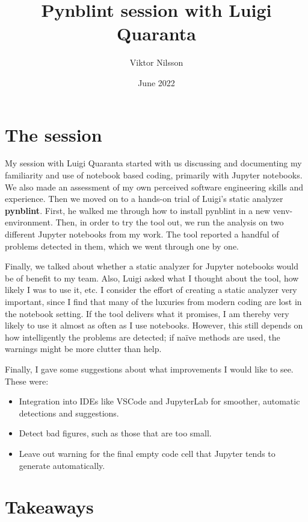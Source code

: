 \documentclass[11pt]{article}
\title{Pynblint session with Luigi Quaranta}
\author{Viktor Nilsson}
\date{June 2022}
\begin{document}
\maketitle

\section{The session}

My session with Luigi Quaranta started with us discussing and documenting my familiarity and use of notebook based coding, primarily with Jupyter notebooks. 
We also made an assessment of my own perceived software engineering skills and experience. 
Then we moved on to a hands-on trial of Luigi's static analyzer \textbf{pynblint}. 
First, he walked me through how to install pynblint in a new venv-environment. 
Then, in order to try the tool out, we run the analysis on two different Jupyter notebooks from my work.
The tool reported a handful of problems detected in them, which we went through one by one.

Finally, we talked about whether a static analyzer for Jupyter notebooks would be of benefit to my team. 
Also, Luigi asked what I thought about the tool, how likely I was to use it, etc.
I consider the effort of creating a static analyzer very important, since I find that many of the luxuries from modern coding are lost in the notebook setting.
If the tool delivers what it promises, I am thereby very likely to use it almost as often as I use notebooks.
However, this still depends on how intelligently the problems are detected; if na\"ive methods are used, the warnings might be more clutter than help.

Finally, I gave some suggestions about what improvements I would like to see.
These were:

\begin{itemize}
\item Integration into IDEs like VSCode and JupyterLab for smoother, automatic detections and suggestions.
\item Detect bad figures, such as those that are too small.
\item Leave out warning for the final empty code cell that Jupyter tends to generate automatically.
\end{itemize}

\section{Takeaways}
\end{document}
